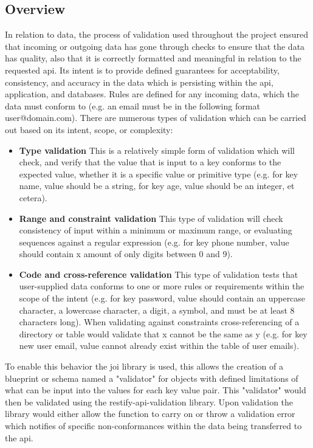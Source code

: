 \subsection{Overview}
	In relation to data, the process of validation used throughout the project ensured that incoming or outgoing data has gone through checks to ensure that the data has quality, also that it is correctly formatted and meaningful in relation to the requested api. Its intent is to provide defined guarantees for acceptability, consistency, and accuracy in the data which is persisting within the api, application, and databases. Rules are defined for any incoming data, which the data must conform to (e.g. an email must be in the following format user@domain.com). There are numerous types of validation which can be carried out based on its intent, scope, or complexity:
	\begin{itemize}
	\item \textbf{Type validation} This is a relatively simple form of validation which will check, and verify that the value that is input to a key conforms to the expected value, whether it is a specific value or primitive type (e.g. for key name, value should be a string, for key age, value should be an integer, et cetera). 
    \item \textbf{Range and constraint validation} This type of validation will check consistency of input within a minimum or maximum range, or evaluating sequences against a regular expression (e.g. for key phone number, value should contain x amount of only digits between 0 and 9).
    \item \textbf{Code and cross-reference validation} This type of validation tests that user-supplied data conforms to one or more rules or requirements within the scope of the intent (e.g. for key password, value should contain an uppercase character, a lowercase character, a digit, a symbol, and must be at least 8 characters long). When validating against constraints cross-referencing of a directory or table would validate that x cannot be the same as y (e.g. for key new user email, value cannot already exist within the table of user emails).
	\end{itemize}
    To enable this behavior the joi library is used, this allows the creation of a blueprint or schema named a "validator" for objects with defined limitations of what can be input into the values for each key value pair. This "validator" would then be validated using the restify-api-validation library. Upon validation the library would either allow the function to carry on or throw a validation error which notifies of specific non-conformances within the data being transferred to the api. 

